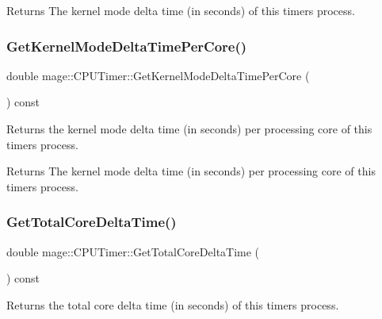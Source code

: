 \begin{DoxyReturn}{Returns}
The kernel mode delta time (in seconds) of this timer\textquotesingle{}s process. 
\end{DoxyReturn}
\hypertarget{classmage_1_1_c_p_u_timer_ae69c9126851135ec5d0eda930ace3999}{}\label{classmage_1_1_c_p_u_timer_ae69c9126851135ec5d0eda930ace3999} 
\subsubsection{\texorpdfstring{Get\+Kernel\+Mode\+Delta\+Time\+Per\+Core()}{GetKernelModeDeltaTimePerCore()}}
{\footnotesize\ttfamily double mage\+::\+C\+P\+U\+Timer\+::\+Get\+Kernel\+Mode\+Delta\+Time\+Per\+Core (\begin{DoxyParamCaption}{ }\end{DoxyParamCaption}) const}

Returns the kernel mode delta time (in seconds) per processing core of this timer\textquotesingle{}s process.

\begin{DoxyReturn}{Returns}
The kernel mode delta time (in seconds) per processing core of this timer\textquotesingle{}s process. 
\end{DoxyReturn}
\hypertarget{classmage_1_1_c_p_u_timer_a5fb59355f6c747be98bfb4d924a0a0ec}{}\label{classmage_1_1_c_p_u_timer_a5fb59355f6c747be98bfb4d924a0a0ec} 
\subsubsection{\texorpdfstring{Get\+Total\+Core\+Delta\+Time()}{GetTotalCoreDeltaTime()}}
{\footnotesize\ttfamily double mage\+::\+C\+P\+U\+Timer\+::\+Get\+Total\+Core\+Delta\+Time (\begin{DoxyParamCaption}{ }\end{DoxyParamCaption}) const}

Returns the total core delta time (in seconds) of this timer\textquotesingle{}s process.

